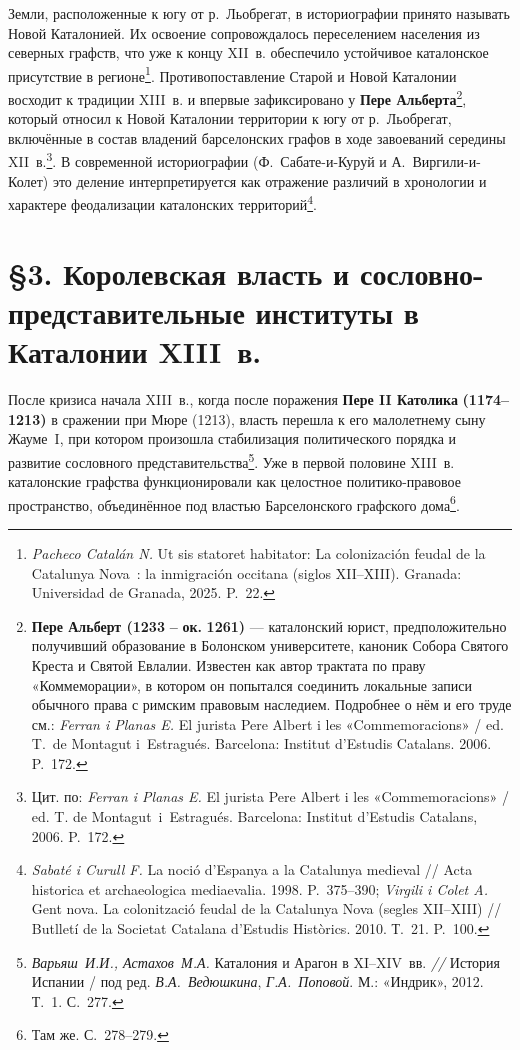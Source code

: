 Земли, расположенные к югу от р.~Льобрегат, в историографии принято называть Новой Каталонией. Их освоение сопровождалось переселением населения из северных графств, что уже к концу XII~в. обеспечило устойчивое каталонское присутствие в регионе\footnote{\emph{Pacheco Catalán N.} Ut sis statoret habitator: La colonización feudal de la Catalunya Nova~: la inmigración occitana (siglos XII--XIII). Granada: Universidad de Granada, 2025. P.~22.}. Противопоставление Старой и Новой Каталонии восходит к традиции XIII~в. и впервые зафиксировано у \textbf{Пере Альберта}\footnote{\textbf{Пере Альберт (1233}\textbf{ -- }\textbf{ок}\textbf{. }\textbf{1261)} --- каталонский юрист, предположительно получивший образование в Болонском университете, каноник Собора Святого Креста и Святой Евлалии. Известен как автор трактата по праву «Коммеморации», в котором он попытался соединить локальные записи обычного права с римским правовым наследием. Подробнее о нём и его труде см.: \emph{Ferran i Planas E.} El jurista Pere Albert i les «Commemoracions» / ed. T.~de Montagut i~Estragués. Barcelona: Institut d’Estudis Catalans. 2006. P.~172.}, который относил к Новой Каталонии территории к югу от р.~Льобрегат, включённые в состав владений барселонских графов в ходе завоеваний середины XII~в.\footnote{Цит. по: \emph{Ferran i Planas E.} El jurista Pere Albert i les «Commemoracions» / ed. T. de Montagut~i~Estragués. Barcelona: Institut d’Estudis Catalans, 2006. P.~172.}. В современной историографии (Ф.~Сабате-и-Куруй и А.~Виргили-и-Колет) это деление интерпретируется как отражение различий в хронологии и характере феодализации каталонских территорий\footnote{\emph{Sabaté i Curull F.} La noció d’Espanya a la Catalunya medieval // Acta historica et archaeologica mediaevalia. 1998. P.~375--390; \emph{Virgili i Colet A.} Gent nova. La colonització feudal de la Catalunya Nova (segles XII--XIII) // Butlletí de la Societat Catalana d’Estudis Històrics. 2010. Т.~21. P.~100.}.

\section*{§3. Королевская власть и сословно-представительные институты в Каталонии XIII~в.}

После кризиса начала XIII~в., когда после поражения \textbf{Пере II Католика }\textbf{(1174--1213)} в сражении при Мюре (1213), власть перешла к его малолетнему сыну Жауме~I, при котором произошла стабилизация политического порядка и развитие сословного представительства\footnote{\emph{Варьяш}\emph{~И.И., Астахов~М.А.} Каталония и Арагон в XI--XIV~вв. \emph{// }История Испании / под ред. \emph{В.А.~Ведюшкина}, \emph{Г.А.~Поповой}. М.: «Индрик», 2012. Т.~1. С.~277.}. Уже в первой половине XIII~в. каталонские графства функционировали как целостное политико-правовое пространство, объединённое под властью Барселонского графского дома\footnote{Там же. С.~278--279.}.

